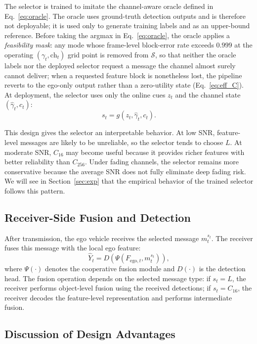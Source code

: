\documentclass[journal]{IEEEtran}
\begin{document}
The selector is trained to imitate the channel-aware oracle defined in Eq.~\eqref{eq:oracle}. The oracle uses ground-truth detection outputs and is therefore not deployable; it is used only to generate training labels and as an upper-bound reference. Before taking the argmax in Eq.~\eqref{eq:oracle}, the oracle applies a \emph{feasibility mask}: any mode whose frame-level block-error rate exceeds $0.999$ at the operating $(\gamma_t,\mathrm{ch}_t)$ grid point is removed from $\mathcal{S}$, so that neither the oracle labels nor the deployed selector request a message the channel almost surely cannot deliver; when a requested feature block is nonetheless lost, the pipeline reverts to the ego-only output rather than a zero-utility state (Eq.~\eqref{eq:eff_C}). At deployment, the selector uses only the online cues $z_t$ and the channel state $(\hat\gamma_t,c_t)$:
\begin{equation}
s_t = g(z_t,\hat\gamma_t,c_t).
\end{equation}

This design gives the selector an interpretable behavior. At low SNR, feature-level messages are likely to be unreliable, so the selector tends to choose $L$. At moderate SNR, $C_{16}$ may become useful because it provides richer features with better reliability than $C_{256}$. Under fading channels, the selector remains more conservative because the average SNR does not fully eliminate deep fading risk. We will see in Section~\ref{sec:exp} that the empirical behavior of the trained selector follows this pattern.

\subsection{Receiver-Side Fusion and Detection}

After transmission, the ego vehicle receives the selected message $m_t^{s_t}$. The receiver fuses this message with the local ego feature:
\begin{equation}
\hat{Y}_t = D\left( \Psi(F_{\mathrm{ego},t}, m_t^{s_t}) \right),
\end{equation}
where $\Psi(\cdot)$ denotes the cooperative fusion module and $D(\cdot)$ is the detection head. The fusion operation depends on the selected message type: if $s_t=L$, the receiver performs object-level fusion using the received detections; if $s_t=C_{16}$, the receiver decodes the feature-level representation and performs intermediate fusion.

\subsection{Discussion of Design Advantages}
\end{document}
